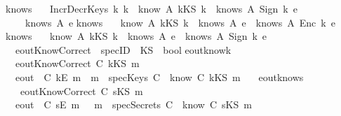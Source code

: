 \begin{isabellebody}
\isanewline
knows{}{\isacharcolon}\ \isanewline
\ \ {\isachardoublequoteopen}{\isacharparenleft}IncrDecrKeys\ k{}\ k{}{\isacharparenright}\ {\isasymand}\ {\isacharparenleft}know\ A\ {\isacharparenleft}kKS\ k{}{\isacharparenright}{\isacharparenright}\ {\isasymand}\ {\isacharparenleft}knows\ A\ {\isacharparenleft}Sign\ k{}\ e{\isacharparenright}{\isacharparenright}\isanewline
\ \ \ {\isasymlongrightarrow}\ knows\ A\ e{\isachardoublequoteclose}\isanewline
{}\isanewline
knows{}{\isacharcolon}\ \isanewline
\ \ {\isachardoublequoteopen}{\isacharparenleft}know\ A\ {\isacharparenleft}kKS\ k{\isacharparenright}{\isacharparenright}\ {\isasymand}\ {\isacharparenleft}knows\ A\ e{}{\isacharparenright}\ {\isasymlongrightarrow}\ knows\ A\ {\isacharparenleft}Enc\ k\ e{}{\isacharparenright}{\isachardoublequoteclose}\isanewline
{}\isanewline
knows{}{\isacharcolon}\ \isanewline
\ \ {\isachardoublequoteopen}{\isacharparenleft}know\ A\ {\isacharparenleft}kKS\ k{\isacharparenright}{\isacharparenright}\ {\isasymand}\ {\isacharparenleft}knows\ A\ e{}{\isacharparenright}\ {\isasymlongrightarrow}\ knows\ A\ {\isacharparenleft}Sign\ k\ e{}{\isacharparenright}{\isachardoublequoteclose}\isanewline
\isanewline
{}\isamarkupfalse \ \ eoutKnowCorrect\ {\isacharcolon}{\isacharcolon}\ {\isachardoublequoteopen}specID\ {\isasymRightarrow}\ KS\ {\isasymRightarrow}\ bool{\isachardoublequoteclose}\isanewline
{}\isanewline
eout{\isacharunderscore}know{\isacharunderscore}k{\isacharcolon}\ \isanewline
\ \ {\isachardoublequoteopen}eoutKnowCorrect\ C\ {\isacharparenleft}kKS\ m{\isacharparenright}\ {\isacharequal}\ \isanewline
\ \ {\isacharparenleft}{\isacharparenleft}eout\ \ C\ {\isacharparenleft}kE\ m{\isacharparenright}{\isacharparenright}\ {\isasymlongleftrightarrow}\ {\isacharparenleft}m\ {\isasymin}\ {\isacharparenleft}specKeys\ C{\isacharparenright}\ {\isasymor}\ {\isacharparenleft}know\ C\ {\isacharparenleft}kKS\ m{\isacharparenright}{\isacharparenright}{\isacharparenright}\ {\isacharparenright}{\isachardoublequoteclose}\ \ {\isacharbar}\isanewline
eout{\isacharunderscore}know{\isacharunderscore}s{\isacharcolon}\ \isanewline
\ \ \ {\isachardoublequoteopen}eoutKnowCorrect\ C\ {\isacharparenleft}sKS\ m{\isacharparenright}\ {\isacharequal}\ \isanewline
\ \ {\isacharparenleft}{\isacharparenleft}eout\ \ C\ {\isacharparenleft}sE\ m{\isacharparenright}{\isacharparenright}\ {\isasymlongleftrightarrow}\ \ {\isacharparenleft}m\ {\isasymin}\ {\isacharparenleft}specSecrets\ C{\isacharparenright}\ {\isasymor}\ {\isacharparenleft}know\ C\ {\isacharparenleft}sKS\ m{\isacharparenright}{\isacharparenright}{\isacharparenright}\ {\isacharparenright}{\isachardoublequoteclose}\isanewline

\end{isabellebody}
